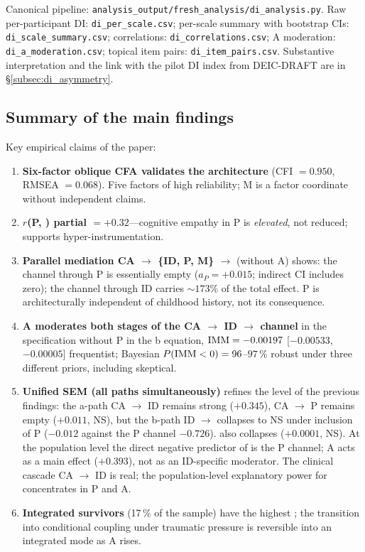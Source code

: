 Canonical pipeline: \texttt{analysis\_output/fresh\_analysis/di\_analysis.py}. Raw per-participant DI: \texttt{di\_per\_scale.csv}; per-scale summary with bootstrap CIs: \texttt{di\_scale\_summary.csv}; correlations: \texttt{di\_correlations.csv}; A moderation: \texttt{di\_a\_moderation.csv}; topical item pairs: \texttt{di\_item\_pairs.csv}. Substantive interpretation and the link with the pilot DI index from DEIC-DRAFT are in §\ref{subsec:di_asymmetry}.

\subsection{Summary of the main findings}

Key empirical claims of the paper:
\begin{enumerate}
    \item \textbf{Six-factor oblique CFA validates the architecture} (CFI $= 0.950$, RMSEA $= 0.068$). Five factors of high reliability; M is a factor coordinate without independent claims.
    \item \textbf{$r$(P, \Ecog{}) partial $= +0.32$}---cognitive empathy in P is \emph{elevated}, not reduced; supports hyper-instrumentation.
    \item \textbf{Parallel mediation CA $\to$ \{ID, P, M\} $\to$ \EAF{}} (without A) shows: the channel through P is essentially empty ($a_P = +0.015$; indirect CI includes zero); the channel through ID carries $\sim 173\%$ of the total effect. P is architecturally independent of childhood history, not its consequence.
    \item \textbf{A moderates both stages of the CA $\to$ ID $\to$ \EAF{} channel} in the specification without P in the b equation, $\mathrm{IMM} = -0.00197$ [$-0.00533$, $-0.00005$] frequentist; Bayesian $P(\mathrm{IMM} < 0) = 96$--$97\,\%$ robust under three different priors, including skeptical.
    \item \textbf{Unified SEM (all paths simultaneously)} refines the level of the previous findings: the a-path CA $\to$ ID remains strong ($+0.345$), CA $\to$ P remains empty ($+0.011$, NS), but the b-path ID $\to$ \EAF{} collapses to NS under inclusion of P ($-0.012$ against the P channel $-0.726$). \IMM{} also collapses ($+0.0001$, NS). At the population level the direct negative predictor of \EAF{} is the P channel; A acts as a main effect ($+0.393$), not as an ID-specific moderator. The clinical cascade CA $\to$ ID is real; the population-level explanatory power for \EAF{} concentrates in P and A.
    \item \textbf{Integrated survivors} (17\,\% of the sample) have the highest \EAF{}; the transition into conditional coupling under traumatic pressure is reversible into an integrated mode as A rises.

\end{enumerate}
